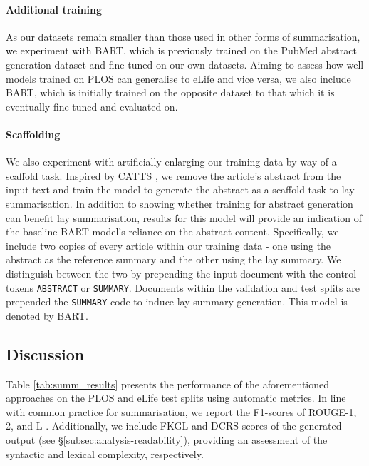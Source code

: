 \documentclass[11pt]{article}
\begin{document}
\paragraph{Additional training} 
As our datasets remain smaller than those used in other forms of summarisation, \textcolor{black}{we experiment with} \textsc{BART}, which is previously trained on the PubMed abstract generation dataset \citep{Cohan2018-nq} and fine-tuned on our own datasets. Aiming to assess how well models trained on PLOS can generalise to eLife and vice versa, we also include \textsc{BART}, which is initially trained on the opposite dataset to that which it is eventually fine-tuned and evaluated on.

\paragraph{Scaffolding}
We also experiment with artificially enlarging our training data by way of a scaffold task. Inspired by CATTS \citep{Cachola2020-bx}, we remove the article's abstract from the input text and train the model to generate the abstract as a scaffold task to lay summarisation. In addition to showing whether training for abstract generation can benefit lay summarisation, results for this model will provide an indication of the baseline \textsc{BART} model's reliance on the abstract content.
Specifically, we include two copies of every article within our training data - one using the abstract as the reference summary and the other using the lay summary. We distinguish between the two by prepending the input document with the control tokens \texttt{ABSTRACT} or \texttt{SUMMARY}. Documents within the validation and test splits are prepended the \texttt{SUMMARY} code to induce lay summary generation. This model is denoted by \textsc{BART}. 

\subsection{Discussion} \label{subsec:results-discussion}
Table \ref{tab:summ_results} presents the performance of the aforementioned approaches on the PLOS and eLife test splits using automatic metrics. In line with common practice for summarisation, we report the F1-scores of ROUGE-1, 2, and L \citep{lin-2004-rouge}. Additionally, we include FKGL and DCRS scores of the generated output (see \S\ref{subsec:analysis-readability}), providing an assessment of the syntactic and lexical complexity, respectively. 
\end{document}
